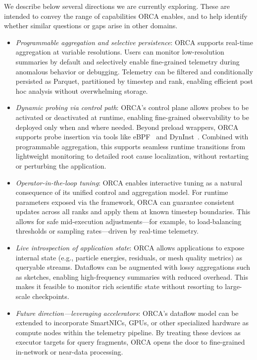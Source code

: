 \documentclass[ letterpaper, DIV=11, numbers=noendperiod]{scrartcl}
\begin{document}
We describe below several directions we are currently exploring. These are
intended to convey the range of capabilities ORCA enables, and to help identify
whether similar questions or gaps arise in other domains.

\begin{itemize}

\item \emph{Programmable aggregation and selective persistence}:
ORCA supports real-time aggregation at variable resolutions. Users can monitor
low-resolution summaries by default and selectively enable fine-grained telemetry
during anomalous behavior or debugging. Telemetry can be filtered and
conditionally persisted as Parquet, partitioned by timestep and rank, enabling
efficient post hoc analysis without overwhelming storage.

\item \emph{Dynamic probing via control path}:
ORCA's control plane allows probes to be activated or deactivated at runtime,
enabling fine-grained observability to be deployed only when and where needed.
Beyond preload wrappers, ORCA supports probe insertion via tools like eBPF~\cite{:eBPF} and
DynInst~\cite{Berna2011:DynInst}. Combined with programmable aggregation, this supports seamless runtime
transitions from lightweight monitoring to detailed root cause localization,
without restarting or perturbing the application.

\item \emph{Operator-in-the-loop tuning}:
ORCA enables interactive tuning as a natural consequence of its unified control
and aggregation model. For runtime parameters exposed via the framework, ORCA
can guarantee consistent updates across all ranks and apply them at known
timestep boundaries. This allows for safe mid-execution adjustments---for
example, to load-balancing thresholds or sampling rates---driven by real-time
telemetry.

\item \emph{Live introspection of application state}:
ORCA allows applications to expose internal state (e.g., particle energies,
residuals, or mesh quality metrics) as queryable streams. Dataflows can be
augmented with lossy aggregations such as sketches, enabling high-frequency
summaries with reduced overhead. This makes it feasible to monitor rich
scientific state without resorting to large-scale checkpoints.

\item \emph{Future direction---leveraging accelerators}:
ORCA's dataflow model can be extended to incorporate SmartNICs, GPUs, or
other specialized hardware as compute nodes within the telemetry pipeline.
By treating these devices as executor targets for query fragments, ORCA opens
the door to fine-grained in-network or near-data processing.

\end{itemize}
\end{document}
